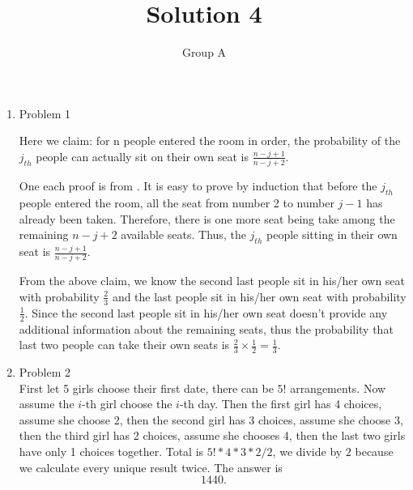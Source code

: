 \documentclass[10pt, onecolumn, draftcls]{IEEEtran}
\begin{document}
\title{Solution 4}
\author{Group A}
\maketitle


\begin{enumerate}
\item Problem 1

Here we claim: for n people entered the room in order, the probability of the $j_{th}$ people can actually sit on their own seat is $\frac{n-j+1}{n-j+2}$.

One each proof is from \cite{drunk}. It is easy to prove by induction that before the $j_{th}$ people entered the room, all the seat from number 2 to number $j-1$ has already been taken. Therefore, there is one more seat being take among the remaining $n-j+2$ available seats. Thus, the $j_{th}$ people sitting in their own seat is $\frac{n-j+1}{n-j+2}$. 

From the above claim, we know the second last people sit in his/her own seat with probability $\frac{2}{3}$ and the last people sit in his/her own seat with probability $\frac{1}{2}$. Since the second last people sit in his/her own seat doesn't provide any additional information about the remaining seats, thus the probability that last two people can take their own seats is $\frac{2}{3}\times \frac{1}{2}=\frac{1}{3}$.

\item
Problem 2\\
First let 5 girls choose their first date, there can be $5!$ arrangements. Now assume the $i$-th girl choose the $i$-th day. Then the first girl has 4 choices, assume she choose 2, then the second girl has 3 choices, assume she choose 3, then the third girl has 2 choices, assume she chooses 4, then the last two girls have only 1 choices together. Total is $5!*4*3*2/2$, we divide by $2$ because we calculate every unique result twice. The answer is
$$1440.$$


\end{enumerate}
\end{document}
